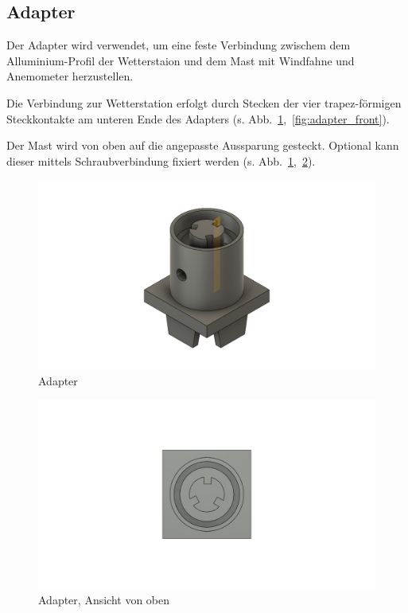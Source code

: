 \subsection{Adapter}\label{sec:ge_adapt}
Der Adapter wird verwendet, um eine feste Verbindung zwischem dem Alluminium-Profil der Wetterstaion und dem Mast mit Windfahne und Anemometer herzustellen.

Die Verbindung zur Wetterstation erfolgt durch Stecken der vier trapez-förmigen Steckkontakte am unteren Ende des Adapters (s. Abb.~\ref{fig:adapter},~\ref{fig:adapter_front}).

Der Mast wird von oben auf die angepasste Aussparung gesteckt. Optional kann dieser mittels Schraubverbindung fixiert werden (s. Abb.~\ref{fig:adapter},~\ref{fig:adapter_top}).
\begin{figure}[H]
  \centering
  \includegraphics[width=\textwidth]{./img/ST_Adapterv4}
  \caption{Adapter}\label{fig:adapter}
\end{figure}
\begin{figure}[H]
  \centering
  \includegraphics[width=\textwidth]{./img/ST_Adapterv4_top}
  \caption{Adapter, Ansicht von oben}\label{fig:adapter_top}
\end{figure}
